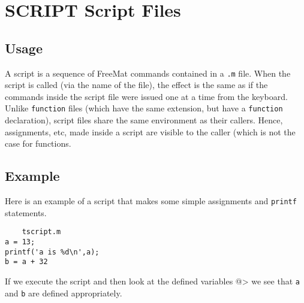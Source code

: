 \section{SCRIPT Script Files}

\subsection{Usage}

A script is a sequence of FreeMat commands contained in a
\verb|.m| file.  When the script is called (via the name of the
file), the effect is the same as if the commands inside the
script file were issued one at a time from the keyboard.
Unlike \verb|function| files (which have the same extension,
but have a \verb|function| declaration), script files share
the same environment as their callers.  Hence, assignments,
etc, made inside a script are visible to the caller (which
is not the case for functions.
\subsection{Example}

Here is an example of a script that makes some simple 
assignments and \verb|printf| statements.
\begin{verbatim}
    tscript.m
a = 13;
printf('a is %d\n',a);
b = a + 32
\end{verbatim}
If we execute the script and then look at the defined variables
@>
we see that \verb|a| and \verb|b| are defined appropriately.
